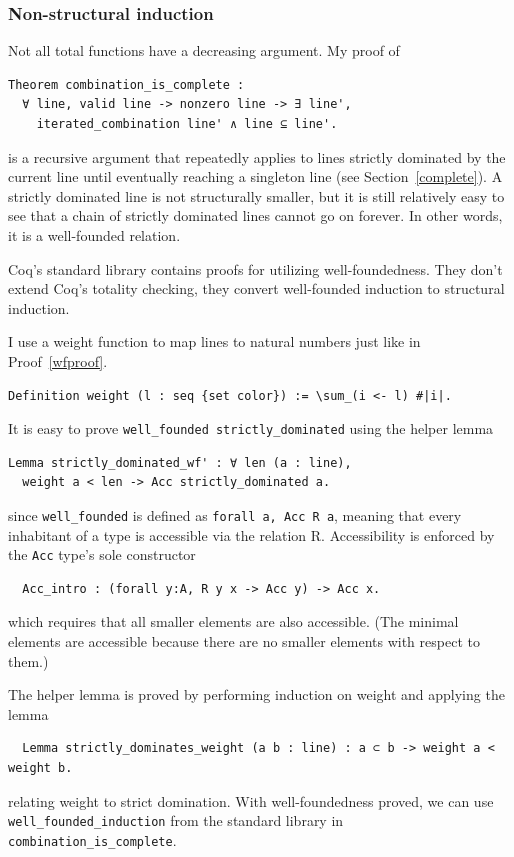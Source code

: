 \documentclass[english, 12pt, a4paper, sci, a-1b, online]{aaltothesis}
\newcommand\icoq[1]{\texttt{#1}}
\begin{document}
\subsubsection{Non-structural induction}

Not all total functions have a decreasing argument. My proof of
\begin{verbatim}
Theorem combination_is_complete :
  ∀ line, valid line -> nonzero line -> ∃ line',
    iterated_combination line' ∧ line ⊆ line'.
\end{verbatim}
is a recursive argument that repeatedly applies to lines strictly dominated by the current line until eventually reaching a singleton line (see Section~\ref{complete}). A strictly dominated line is not structurally smaller, but it is still relatively easy to see that a chain of strictly dominated lines cannot go on forever. In other words, it is a well-founded relation.

Coq's standard library contains proofs for utilizing well-foundedness. They don't extend Coq's totality checking, they convert well-founded induction to structural induction.

I use a weight function to map lines to natural numbers just like in Proof~\ref{wfproof}.
\begin{verbatim}
Definition weight (l : seq {set color}) := \sum_(i <- l) #|i|.
\end{verbatim}
It is easy to prove \icoq{well_founded strictly_dominated} using the helper lemma
\begin{verbatim}
Lemma strictly_dominated_wf' : ∀ len (a : line),
  weight a < len -> Acc strictly_dominated a.
\end{verbatim}
since \icoq{well_founded} is defined as \icoq{forall a, Acc R a}, meaning that every inhabitant of a type is accessible via the relation R. Accessibility is enforced by the \icoq{Acc} type's sole constructor
\begin{verbatim}
  Acc_intro : (forall y:A, R y x -> Acc y) -> Acc x.
\end{verbatim}
which requires that all smaller elements are also accessible. (The minimal elements are accessible because there are no smaller elements with respect to them.)

The helper lemma is proved by performing induction on weight and applying the lemma
\begin{verbatim}
  Lemma strictly_dominates_weight (a b : line) : a ⊂ b -> weight a < weight b.
\end{verbatim}
relating weight to strict domination. With well-foundedness proved, we can use \icoq{well_founded_induction} from the standard library in \icoq{combination_is_complete}.
\end{document}
